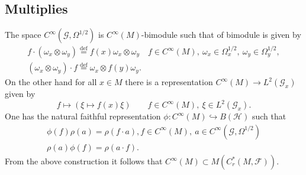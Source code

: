 \documentclass{beamer}
\theoremstyle{plain}
\newcommand{\be}{\begin{equation}}
\newcommand{\ee}{\end{equation}}
\newcommand{\Om}{\Omega}
\newcommand{\sF}{\mathcal{F}}       %
\newcommand{\sH}{\mathcal{H}}       %
\newcommand{\bydef}{\stackrel{\mathrm{def}}{=}}
\newcommand{\hookto}{\hookrightarrow}        %
\begin{document}
\subsection{Multiplies}
\begin{frame}
	The space $C^{\infty} (\mathcal G , \Omega^{1/2})$ is $C^{\infty} \left(M\right)$-bimodule such that of bimodule is given by
	\be\nonumber
	\begin{split}
		f\cdot \left(\omega_x \otimes \omega_y \right) \bydef f\left(x \right)\omega_x \otimes \omega_y \quad f \in C^{\infty} \left(M\right),~\omega_x \in \Om^{1/2}_x, ~ \omega_y \in \Om^{1/2}_y, \\
		\left(\omega_x \otimes \omega_y \right) \cdot f \bydef \omega_x \otimes f\left(y \right)\omega_y.
	\end{split}
	\ee
	On the other hand for all $x \in M$ there is a representation $C^{\infty} \left(M\right)\to L^2\left( \mathcal G_x\right)$ given by
	$$
	f \mapsto \left( \xi \mapsto f\left( x\right)\xi \right) \quad  \quad f \in C^{\infty} \left(M\right),~\xi \in L^2\left( \mathcal G_x\right).
	$$
	One has the natural faithful representation
	$
	\phi:  C^{\infty} \left(M\right)\hookto B\left(\sH \right)
	$
	such that
	\be\nonumber
	\begin{split}
		\phi\left( f\right) \rho\left( a\right) = \rho\left(f\cdot a \right),  f \in  C^{\infty} \left(M\right), ~a \in C^{\infty} (\mathcal G , \Omega^{1/2})\\
		\rho\left( a\right) \phi\left( f\right)= \rho\left(a\cdot f \right).
	\end{split}
	\ee
	From the above construction it follows that $C^{\infty} \left(M\right)\subset M\left( C^*_r(M, \sF)\right)$. 
\end{frame}
\end{document}

